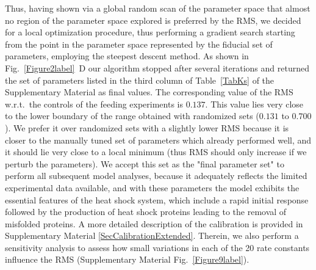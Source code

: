 \documentclass[oneside, 10pt, a4paper, twocolumn]{article}
\begin{document}
Thus, having shown via a global random scan of the parameter space that almost no region of the parameter space explored is preferred by the RMS, we decided for a local optimization procedure, thus performing a gradient search starting from the point in the parameter space represented by the fiducial set of parameters, 
employing the steepest descent method. 
As shown in Fig.~\ref{Figure2label}~D our algorithm stopped after several iterations and returned the set of parameters listed in the third column of Table~\ref{TabKs} of the Supplementary Material as final values. The corresponding value of the RMS w.r.t.~the controls of the feeding experiments is $0.137$. This value lies very close to the lower boundary of the range obtained with randomized sets ($0.131$ to $0.700$). We prefer it over randomized sets with a slightly lower RMS {because} it is closer to the manually tuned set of parameters which already performed well, and it should lie very close to a local minimum (thus RMS should only increase if we perturb the parameters).
{We accept this set as the "final parameter set" to perform all subsequent model analyses, because it adequately reflects the limited 
experimental data available, and with these parameters the model exhibits the essential features of the heat shock system, which
include a rapid initial response followed by the production of heat shock proteins leading to the removal of misfolded proteins.}
A more detailed description of the calibration 
is provided in Supplementary Material \ref{SecCalibrationExtended}. 
{Therein, we also perform a sensitivity analysis to assess how small variations in each of the 20 rate constants influence the RMS  (Supplementary Material Fig.~\ref{Figure9label}).} 
 
\end{document}

